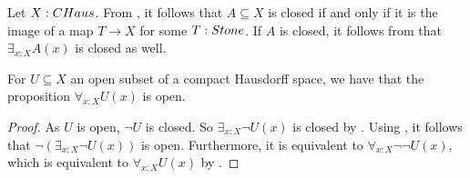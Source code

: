 \begin{remark}\label{InhabitedClosedSubSpaceClosedCHaus}
  Let $X:\Chaus$.
  From , it follows that $A\subseteq X$ is closed if and only if it is the image of a map 
  $T\to X$ for some $T:\Stone$. 
  If $A$ is closed, it follows from  that $\exists_{x:X} A(x)$ is closed as well. 
\end{remark}


\begin{corollary}\label{AllOpenSubspaceOpen}
  For $U\subseteq X$ an open subset of a compact Hausdorff space, we have that the proposition 
  $\forall_{x:X} U(x)$ is open. 
\end{corollary}
\begin{proof}
  As $U$ is open, $\neg U$ is closed. 
  So $\exists_{x:X} \neg U(x)$ is closed by . 
  Using , it follows that 
  $\neg (\exists_{x:X} \neg U(x))$ is open. 
  Furthermore, it is equivalent to $\forall_{x:X} \neg \neg U(x)$, 
  which is equivalent to $\forall_{x:X} U(x)$ by .
\end{proof}

